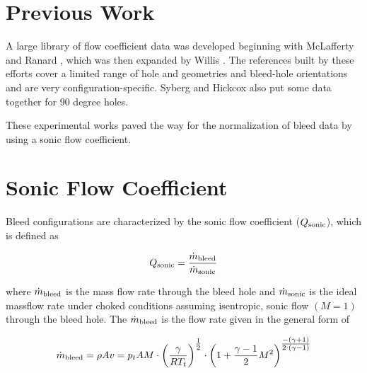 
\section{Previous Work}


A large library of flow coefficient data was developed beginning with McLafferty and Ranard \cite{McLafferty1958}, which was then expanded by Willis \cite{Willis1995}. The references built by these efforts cover a limited range of hole and geometries and bleed-hole orientations and are very configuration-specific. Syberg and Hickcox \cite{Syberg1973} also put some data together for 90 degree holes.

These experimental works paved the way for the normalization of bleed data by using a sonic flow coefficient.


\section{Sonic Flow Coefficient}

Bleed configurations are characterized by the sonic flow coefficient ($Q_{\textrm{sonic}}$), which is defined as

$$ Q_{\textrm{sonic}} = \frac{\dot{m}_{\textrm{bleed}}}{\dot{m}_{\textrm{sonic}}} $$


where $\dot{m}_{\textrm{bleed}}$ is the mass flow rate through the bleed hole and $\dot{m}_{\textrm{sonic}}$ is the ideal massflow rate under choked conditions assuming isentropic, sonic flow $(M=1)$ through the bleed hole. The $\dot{m}_{\textrm{bleed}}$ is the flow rate given in the general form of

$$ \dot{m}_{\textrm{bleed}} = \rho A v = p_t A M \cdot \qty(\frac{\gamma}{RT_t})^{\textstyle\frac{1}{2}} \cdot \qty(1 + \frac{\gamma-1}{2}M^2)^{\textstyle\frac{-\qty(\gamma+1)}{2\cdot\qty(\gamma-1)}} $$

